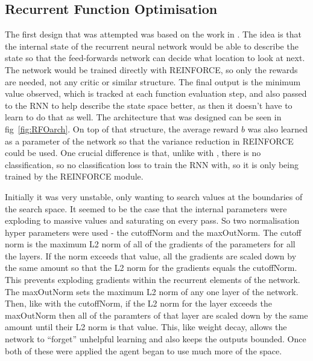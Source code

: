 \subsection{Recurrent Function Optimisation}
The first design that was attempted was based on the work in \cite{RVA}. The idea is that the internal state of the recurrent neural network would be able to describe the state so that the feed-forwards network can decide what location to look at next. The network would be trained directly with REINFORCE, so only the rewards are needed, not any critic or similar structure. The final output is the minimum value observed, which is tracked at each function evaluation step, and also passed to the RNN to help describe the state space better, as then it doesn't have to learn to do that as well. The architecture that was designed can be seen in fig~\ref{fig:RFOarch}. On top of that structure, the average reward $b$ was also learned as a parameter of the network so that the variance reduction in REINFORCE could be used. One crucial difference is that, unlike with \cite{RVA}, there is no classification, so no classification loss to train the RNN with, so it is only being trained by the REINFORCE module.

Initially it was very unstable, only wanting to search values at the boundaries of the search space. It seemed to be the case that the internal parameters were exploding to massive values and saturating on every pass. So two normalisation hyper parameters were used - the cutoffNorm and the maxOutNorm. The cutoff norm is the maximum L2 norm of all of the gradients of the parameters for all the layers. If the norm exceeds that value, all the gradients are scaled down by the same amount so that the L2 norm for the gradients equals the cutoffNorm. This prevents exploding gradients within the recurrent elements of the network. The maxOutNorm sets the maximum L2 norm of any one layer of the network. Then, like with the cutoffNorm, if the L2 norm for the layer exceeds the maxOutNorm then all of the paramters of that layer are scaled down by the same amount until their L2 norm is that value. This, like weight decay, allows the network to ``forget'' unhelpful learning and also keeps the outputs bounded. Once both of these were applied the agent began to use much more of the space.

